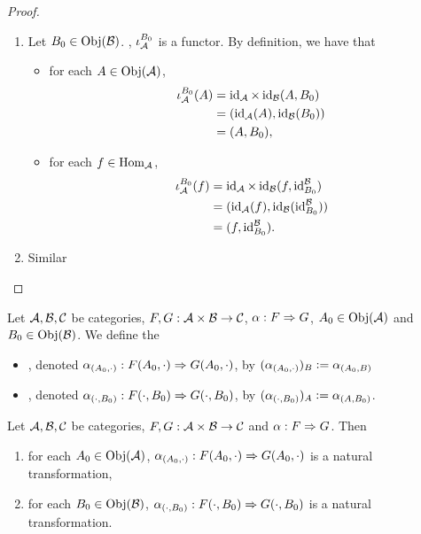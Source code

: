 \documentclass{book}
\begin{document}
	\begin{proof}\
		\begin{enumerate}
			\item Let $B_0 \in \operatorname{Obj}(\mathcal{B})$. , $\iota_{\mathcal{A}}^{B_0}$ is a functor. By definition, we have that
			\begin{itemize}
				\item for each $A \in \operatorname{Obj}(\mathcal{A})$, 
				\begin{align*}
					\iota_{\mathcal{A}}^{B_0}(A)
					& = \operatorname{id}_{\mathcal{A}} \times \operatorname{id}_{\mathcal{B}}(A, B_0) \\
					& = (\operatorname{id}_{\mathcal{A}}(A), \operatorname{id}_{\mathcal{B}}(B_0)) \\ 
					& = (A, B_0),
				\end{align*}
				\item for each $f \in \operatorname{Hom}_{\mathcal{A}}$, 
				\begin{align*}
					\iota_{\mathcal{A}}^{B_0}(f)
					& = \operatorname{id}_{\mathcal{A}} \times \operatorname{id}_{\mathcal{B}}(f, \operatorname{id}_{B_0}^{\mathcal{B}}) \\
					& = (\operatorname{id}_{\mathcal{A}}(f), \operatorname{id}_{\mathcal{B}}(\operatorname{id}_{B_0}^{\mathcal{B}})) \\
					& = (f, \operatorname{id}_{B_0}^{\mathcal{B}}).
				\end{align*}
			\end{itemize} 
			\item Similar 
		\end{enumerate}
	\end{proof}
	
	\begin{defn} 
		Let $\mathcal{A}, \mathcal{B}, \mathcal{C}$ be categories, $F,G :\mathcal{A} \times \mathcal{B} \rightarrow \mathcal{C}$, $\alpha: F \Rightarrow G$, $A_0 \in \operatorname{Obj}(\mathcal{A})$ and $B_0 \in \operatorname{Obj}(\mathcal{B})$. We define the
		\begin{itemize}
			\item {}, denoted $\alpha_{(A_0, \cdot)}: F(A_0, \cdot) \Rightarrow G(A_0, \cdot)$, by 
			$(\alpha_{(A_0, \cdot)})_B \vcentcolon= \alpha_{(A_0, B)}$
			\item {}, denoted $\alpha_{(\cdot, B_0)}: F(\cdot, B_0) \Rightarrow G(\cdot, B_0)$, by 
			$(\alpha_{(\cdot, B_0)})_A \vcentcolon= \alpha_{(A, B_0)}$. 
		\end{itemize}
	\end{defn}
	
	\begin{ex} 
		Let $\mathcal{A}, \mathcal{B}, \mathcal{C}$ be categories, $F,G :\mathcal{A} \times \mathcal{B} \rightarrow \mathcal{C}$ and $\alpha: F \Rightarrow G$. Then
		\begin{enumerate}
			\item for each $A_0 \in \operatorname{Obj}(\mathcal{A})$, $\alpha_{(A_0, \cdot)}: F(A_0, \cdot) \Rightarrow G(A_0, \cdot)$ is a natural transformation,
			\item for each $B_0 \in \operatorname{Obj}(\mathcal{B})$, $\alpha_{(\cdot, B_0)}: F(\cdot, B_0) \Rightarrow G(\cdot, B_0)$ is a natural transformation.
		\end{enumerate}
	\end{ex}
	
\end{document}
